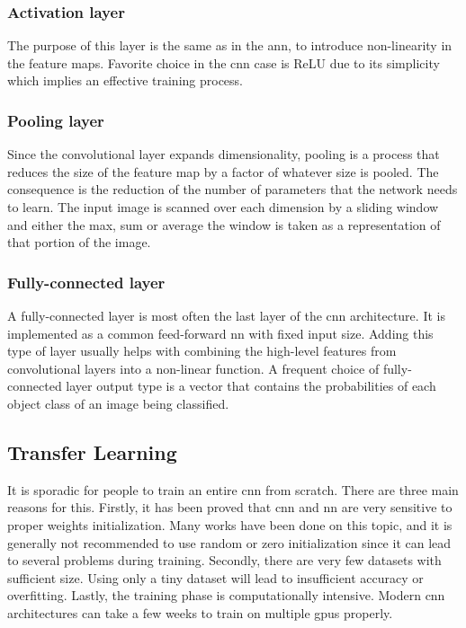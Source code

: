         \subsubsection{Activation layer}
            The purpose of this layer is the same as in the \gls{ann}, to introduce non-linearity in the feature maps. Favorite choice in the \gls{cnn} case is ReLU due to its simplicity which implies an effective training process.
            
        \subsubsection{Pooling layer}
            Since the convolutional layer expands dimensionality, pooling is a process that reduces the size of the feature map by a factor of whatever size is pooled. The consequence is the reduction of the number of parameters that the network needs to learn. The input image is scanned over each dimension by a sliding window and either the max, sum or average the window is taken as a representation of that portion of the image. 
            
        \subsubsection{Fully-connected layer}
            A fully-connected layer is most often the last layer of the \gls{cnn} architecture. It is implemented as a common feed-forward \gls{nn} with fixed input size. Adding this type of layer usually helps with combining the high-level features from convolutional layers into a non-linear function. A frequent choice of fully-connected layer output type is a vector that contains the probabilities of each object class of an image being classified.

    \subsection{Transfer Learning}
        It is sporadic for people to train an entire \gls{cnn} from scratch. There are three main reasons for this. Firstly, it has been proved that \gls{cnn} and \gls{nn} are very sensitive to proper weights initialization. Many works have been done on this topic, and it is generally not recommended to use random or zero initialization since it can lead to several problems during training. Secondly, there are very few datasets with sufficient size. Using only a tiny dataset will lead to insufficient accuracy or overfitting. Lastly, the training phase is computationally intensive. Modern \gls{cnn} architectures can take a few weeks to train on multiple \gls{gpu}s properly.

